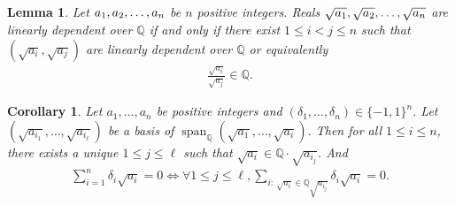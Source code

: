 \documentclass[a4paper, 11pt,dvipsnames]{article}
\newtheorem{lemma}[theorem]{Lemma}
\newtheorem{corollary}{Corollary}
\DeclareMathOperator{\spn}{span}
\begin{document}
			\begin{lemma} Let $a_{1},a_{2},\dots,a_{n}$ be $n$ positive integers. Reals $\lsst a n$ are linearly dependent over $\mathbb{Q}$ if and only if there exist $ 1 \le i < j \le n
				$ such that $(\sqrt{a_i}, \sqrt{a_j})$ are linearly dependent over $\mathbb{Q}$ or equivalently \begin{align} \frac{\sqrt{a_i}}{\sqrt{a_j}} \in \mathbb{Q}.
					\label{eq:lindep} \end{align} \label{lemma:pairwise_dependence} \end{lemma}

			\begin{corollary}
				\label{cor:subsum}
				Let $a_1, \dots, a_n$ be positive integers and $(\delta_1, \dots, \delta_n) \in \{-1,1\}^n$. Let $(\sqrt{a_{i_1}}, \dots, \sqrt{a_{i_\ell}})$ be a basis of $\spn_{\mathbb{Q}}(\sqrt{a_1},\dots, \sqrt{a_i})$. Then for all $1 \le i \le n$, there exists a unique $1 \le j \le \ell$ such that $\sqrt{a_i} \in \mathbb{Q} \cdot \sqrt{a_{i_j}}$. And \begin{align} \sum_{i=1}^n \delta_i \sqrt{a_i} = 0 \iff \forall 1 \le j \le \ell, \sum_{i:~\sqrt{a_i} \in \mathbb{Q} \sqrt{a_{i_j}}} \delta_i \sqrt{a_i} = 0. \end{align}
			\end{corollary}
\end{document}
